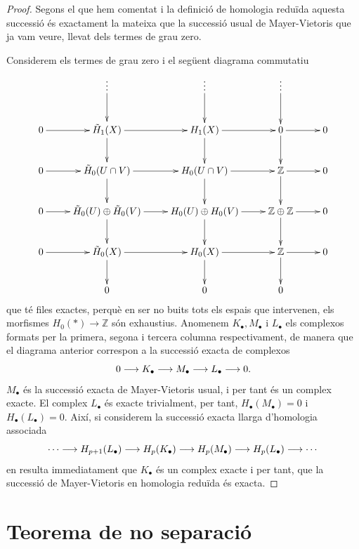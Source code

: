 \documentclass[../main.tex]{subfiles}
\begin{document}
\begin{proof}
Segons el que hem comentat i la definició de homologia reduïda aquesta successió és exactament la mateixa que la successió usual de Mayer-Vietoris que ja vam veure, llevat dels termes de grau zero. 

Considerem els termes de grau zero i el següent diagrama commutatiu
\begin{equation}
    \notag
    \xymatrix{
    & \vdots \ar[d] & \vdots \ar[d] & \vdots \ar[d] & \\
    0\ar[r] & \Tilde{H}_1(X)\ar[r]\ar[d] & H_1(X)\ar[r]\ar[d] & 0\ar[r]\ar[d] & 0 \\
    0 \ar[r] & \Tilde{H}_0(U\cap V)\ar[r]\ar[d] & H_0(U\cap V)\ar[r]\ar[d] & \mathbb{Z}\ar[r]\ar[d] & 0\\
    0 \ar[r] & \Tilde{H}_0(U)\oplus \Tilde{H}_0(V)\ar[r]\ar[d] & H_0(U)\oplus H_0(V)\ar[d]\ar[r]& \mathbb{Z}\oplus \mathbb{Z}\ar[r]\ar[d] & 0 \\
    0 \ar[r] & \Tilde{H}_0(X)\ar[r]\ar[d] & H_0(X)\ar[r]\ar[d] & \mathbb{Z}\ar[r]\ar[d] & 0 \\
    & 0 & 0 & 0 &
    }
\end{equation}
que té files exactes, perquè en ser no buits tots els espais que intervenen, els morfismes $H_0(*)\rightarrow \mathbb{Z}$ són exhaustius. Anomenem $K_\bullet, M_\bullet$ i $L_\bullet$ els complexos formats per la primera, segona i tercera columna respectivament, de manera que el diagrama anterior correspon a la successió exacta de complexos
\begin{equation}
    \notag
    0\longrightarrow K_\bullet\longrightarrow M_\bullet\longrightarrow L_\bullet\longrightarrow 0.
\end{equation}
$M_\bullet$ és la successió exacta de Mayer-Vietoris usual, i per tant és un complex exacte. El complex $L_\bullet$ és exacte trivialment, per tant, $H_\bullet(M_\bullet)=0$ i $H_\bullet(L_\bullet) = 0$. Així, si considerem la successió exacta llarga d'homologia associada
\begin{equation}
    \notag
    \cdots\longrightarrow H_{p+1}(L_\bullet)\longrightarrow H_p(K_\bullet)\longrightarrow H_p(M_\bullet)\longrightarrow H_p(L_\bullet)\longrightarrow\cdots
\end{equation}
en resulta immediatament que $K_\bullet$ és un complex exacte i per tant, que la successió de Mayer-Vietoris en homologia reduïda és exacta.
\end{proof}

\section{Teorema de no separació}
\end{document}
